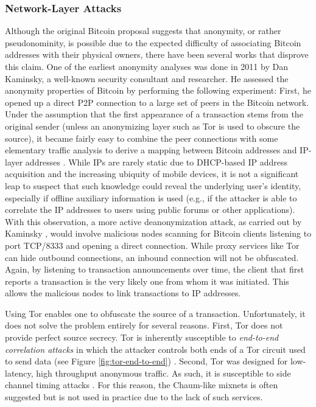 \subsubsection{Network-Layer Attacks}
Although the original Bitcoin proposal suggests that anonymity, or rather pseudonominity, is possible due to the expected difficulty of associating Bitcoin addresses with their physical owners, there have been several works that disprove this claim. One of the earliest anonymity analyses was done in 2011 by Dan Kaminsky, a well-known security consultant and researcher. He assessed the anonymity properties of Bitcoin by performing the following experiment: First, he opened up a direct P2P connection to a large set of peers in the Bitcoin network. Under the assumption that the first appearance of a transaction stems from the original sender (unless an anonymizing layer such as Tor is used to obscure the source), it became fairly easy to combine the peer connections with some elementary traffic analysis to derive a mapping between Bitcoin addresses and IP-layer addresses \cite{kaminsky}. While IPs are rarely static due to DHCP-based IP address acquisition and the increasing ubiquity of mobile devices, it is not a significant leap to suspect that such knowledge could reveal the underlying user's identity, especially if offline auxiliary information is used (e.g., if the attacker is able to correlate the IP addresses to users using public forums or other applications). With this observation, a more active deanonymization attack, as carried out by Kaminsky \cite{kaminsky,ReidHarrigan13}, would involve malicious nodes scanning for Bitcoin clients listening to port TCP/8333 and opening a direct connection. While proxy services like Tor can hide outbound connections, an inbound connection will not be obfuscated. Again, by listening to transaction announcements over time, the client that first reports a transaction is the very likely one from whom it was initiated. This allows the malicious nodes to link transactions to IP addresses.

Using Tor enables one to obfuscate the source of a transaction. Unfortunately, it does not solve the problem entirely for several reasons. First, Tor does not provide perfect source secrecy. Tor is inherently susceptible to \emph{end-to-end correlation attacks} in which the attacker controls both ends of a Tor circuit used to send data (see Figure \ref{fig:tor-end-to-end}) \cite{tor-attack2}. Second, Tor was designed for low-latency, high throughput anonymous traffic. As such, it is susceptible to side channel timing attacks \cite{bitcoin-tor-wiki}. For this reason, the Chaum-like mixnets is often suggested but is not used in practice due to the lack of such services. 

